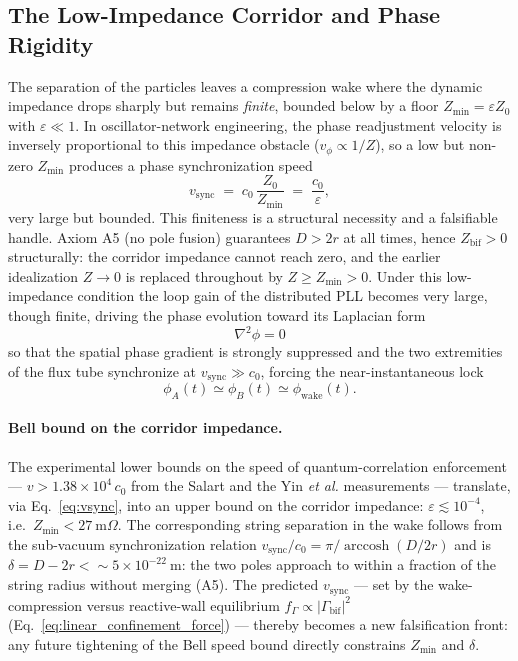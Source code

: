 \documentclass[11pt,a4paper]{article}
\theoremstyle{plain}
\theoremstyle{remark}
\begin{document}
\subsection{The Low-Impedance Corridor and Phase Rigidity}
The separation of the particles leaves a compression wake where the dynamic impedance drops sharply but remains \emph{finite}, bounded below by a floor $Z_{\min} = \varepsilon Z_0$ with $\varepsilon \ll 1$. In oscillator-network engineering, the phase readjustment velocity is inversely proportional to this impedance obstacle ($v_\phi \propto 1/Z$), so a low but non-zero $Z_{\min}$ produces a phase synchronization speed
\begin{equation}\label{eq:vsync}
v_{\text{sync}} \;=\; c_0\,\frac{Z_0}{Z_{\min}} \;=\; \frac{c_0}{\varepsilon},
\end{equation}
very large but bounded. This finiteness is a structural necessity and a falsifiable handle. Axiom A5 (no pole fusion) guarantees $D > 2r$ at all times, hence $Z_{\text{bif}} > 0$ structurally: the corridor impedance cannot reach zero, and the earlier idealization $Z \to 0$ is replaced throughout by $Z \ge Z_{\min} > 0$. Under this low-impedance condition the loop gain of the distributed PLL becomes very large, though finite, driving the phase evolution toward its Laplacian form
\begin{equation}
\nabla^2 \phi = 0
\end{equation}
so that the spatial phase gradient is strongly suppressed and the two extremities of the flux tube synchronize at $v_{\text{sync}} \gg c_0$, forcing the near-instantaneous lock
\begin{equation}
\phi_{A}(t) \simeq \phi_{B}(t) \simeq \phi_{\text{wake}}(t).
\end{equation}

\paragraph{Bell bound on the corridor impedance.} The experimental lower bounds on the speed of quantum-correlation enforcement --- $v > 1.38\times10^4\,c_0$ from the Salart and the Yin \emph{et al.} measurements --- translate, via Eq.~\eqref{eq:vsync}, into an upper bound on the corridor impedance: $\varepsilon \lesssim 10^{-4}$, i.e.\ $Z_{\min} < 27~\text{m}\Omega$. The corresponding string separation in the wake follows from the sub-vacuum synchronization relation $v_{\text{sync}}/c_0 = \pi/\operatorname{arccosh}(D/2r)$ and is $\delta = D - 2r < \sim 5\times10^{-22}~\text{m}$: the two poles approach to within a fraction of the string radius without merging (A5). The predicted $v_{\text{sync}}$ --- set by the wake-compression versus reactive-wall equilibrium $f_\Gamma \propto |\Gamma_{\text{bif}}|^2$ (Eq.~\ref{eq:linear_confinement_force}) --- thereby becomes a new falsification front: any future tightening of the Bell speed bound directly constrains $Z_{\min}$ and $\delta$.
\end{document}
